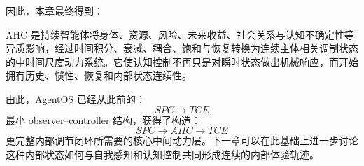 因此，本章最终得到：

\begin{conclusion}
AHC 是持续智能体将身体、资源、风险、未来收益、社会关系与认知不确定性等异质影响，经过时间积分、衰减、耦合、饱和与恢复转换为连续主体相关调制状态的中时间尺度动力系统。它使认知控制不再只是对瞬时状态做出机械响应，而开始拥有历史、惯性、恢复和内部状态连续性。
\end{conclusion}

由此，AgentOS 已经从此前的：
\[
SPC\rightarrow TCE
\]
最小 observer--controller 结构，获得了构造：
\[
SPC\rightarrow AHC\rightarrow TCE
\]
更完整内部调节闭环所需要的核心中间动力层。下一章可以在此基础上进一步讨论这种内部状态如何与自我感知和认知控制共同形成连续的内部体验轨迹。
